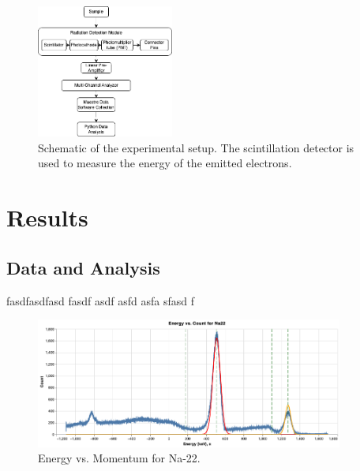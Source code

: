 \documentclass[12pt]{article}
\begin{document}
                        \begin{figure}[htb!]
                                \centering
                                \includegraphics[width=0.4\textwidth]{./img/other/Lab2 Apparatus.drawio.png}
                                \caption{Schematic of the experimental setup. The scintillation detector is used to measure the energy of the emitted electrons.}
                                \label{fig:Schematic of the experimental setup. The scintillation detector is used to measure the energy of the emitted electrons.}
                        \end{figure}



\section{Results}
        \subsection{Data and Analysis}
        fasdfasdfasd fasdf asdf asfd asfa sfasd f

\newpage
\vfill

        \begin{figure}[h!]
                \centering
                \includegraphics[width=0.9\textwidth]{./img/plots/graph2.png}
                \caption{Energy vs. Momentum for Na-22.}
        \end{figure}
\end{document}
